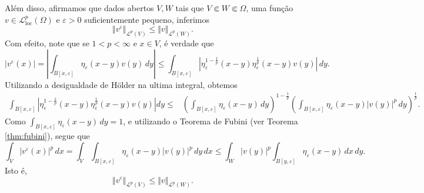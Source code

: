 \documentclass[a4paper, 11pt]{book}
\theoremstyle{definition}
\newcommand{\cL}{\mathcal{L}}
\newcommand{\loc}{\mathrm{loc}}
\begin{document}
\begin{prf}
    Além disso, afirmamos que dados abertos $V, W$ tais que $V \Subset W \Subset \Omega$, uma função $v \in \cL^p_\loc(\Omega)$ e $\varepsilon > 0$ suficientemente pequeno, inferimos
    \begin{equation}
        \Vert v^\varepsilon \Vert_{\cL^p(V)} \leqslant \Vert v \Vert_{\cL^p(W)}.
    \end{equation}
    Com efeito, note que se $1 < p < \infty$ e $x \in V$, é verdade que
    \[
        |v^\varepsilon(x)| = \left| \int_{B[x,\varepsilon]} \eta_\varepsilon(x-y) v (y) \,dy \right| \leqslant \int_{B[x,\varepsilon]} \left| \eta_\varepsilon^{1-\frac{1}{p}}(x-y) \eta_\varepsilon^{\frac{1}{p}}(x-y) v(y) \right| \,dy.
    \]
    Utilizando a desigualdade de Hölder na ultima integral, obtemos
    \[
        \begin{aligned}
            \int_{B[x,\varepsilon]} \left| \eta_\varepsilon^{1-\frac{1}{p}}(x-y) \eta_\varepsilon^{\frac{1}{p}}(x-y) v(y) \right|dy \leqslant &\left( \int_{B[x,\varepsilon]} \eta_\varepsilon (x-y) \,dy\right)^{\!1-\frac{1}{p}}\left( \int_{B[x,\varepsilon]} \eta_\varepsilon(x-y) |v(y)|^p \,dy \right)^{\frac{1}{p}}.
        \end{aligned}
    \]
    Como $\int_{B[x,\varepsilon]} \eta_\varepsilon(x-y) \,dy = 1$, e utilizando o Teorema de Fubini (ver Teorema \ref{thm:fubini}), segue que
    \[
        \int_V |v^\varepsilon(x)|^p \,dx = \int_V \int_{B[x,\varepsilon]} \eta_\varepsilon(x-y) |v(y)|^p \,dy \,dx \leqslant \int_W |v(y)|^p \int_{B[y,\varepsilon]} \eta_\varepsilon(x-y) \,dx \,dy.
    \]
    Isto é,
    \begin{equation} \label{eq:assss}
        \Vert v^\varepsilon \Vert_{\cL^p(V)} \leqslant \Vert v \Vert_{\cL^p(W)}.
    \end{equation}


\end{prf}
\end{document}
